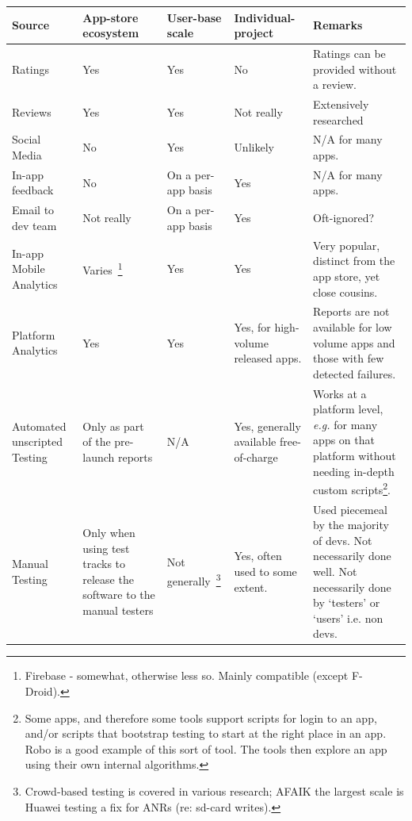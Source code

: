 
\begin{table}[H]
	\setlength\tabcolsep{0.4em} %
	\def\arraystretch{1}%
	\footnotesize %
	\begin{tabular}{L{2cm} L{2.4cm} L{3cm} L{2.4cm} L{4cm}} %
		\toprule
		\textbf{Source} & \textbf{App-store ecosystem} & \textbf{User-base scale} & \textbf{Individual-project} & \textbf{Remarks} \\ \midrule
		Ratings & Yes & Yes & No & Ratings can be provided without a review. \\ \midrule
		Reviews & Yes & Yes & Not really & Extensively researched \\ \midrule
		Social Media & No & Yes & Unlikely & N/A for many apps. \\ \midrule
		In-app feedback & No & On a per-app basis & Yes & N/A for many apps. \\ \midrule
		Email to dev team & Not really & On a per-app basis & Yes & Oft-ignored? \\ \midrule
		In-app Mobile Analytics & Varies~\footnote{Firebase - somewhat, otherwise less so. Mainly compatible (except F-Droid).} & Yes & Yes & Very popular, distinct from the app store, yet close cousins. \\ \midrule
		Platform Analytics & Yes & Yes & Yes, for high-volume released apps. & Reports are not available for low volume apps and those with few detected failures.  \\ \midrule
		Automated unscripted Testing & Only as part of the pre-launch reports & N/A & Yes, generally available free-of-charge & Works at a platform level, \emph{e.g.} for many apps on that platform without needing in-depth custom scripts\footnote{ Some apps, and therefore some tools support scripts for login to an app, and/or scripts that bootstrap testing to start at the right place in an app. Robo is a good example of this sort of tool. The tools then explore an app using their own internal algorithms.}. \\ \midrule
		Manual Testing & Only when using test tracks to release the software to the manual testers & Not generally~\footnote{Crowd-based testing is covered in various research; AFAIK the largest scale is Huawei testing a fix for ANRs (re: sd-card writes).} & Yes, often used to some extent. & Used piecemeal by the majority of devs. Not necessarily done well. Not necessarily done by ‘testers’ or ‘users’ i.e. non devs. \\ \midrule

\end{tabular}
\end{table}
